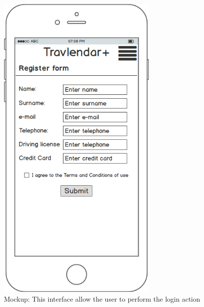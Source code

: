 \documentclass[numbers=noenddot, 12pt, a4paper, oneside]{scrbook}
\begin{document}
\begin{figure}[H]
	\centering
	\includegraphics[width=0.7\textwidth]{mockups/Login}
	\caption{Mockup: This interface allow the user to perform the login action}
\end{figure}
\end{document}
